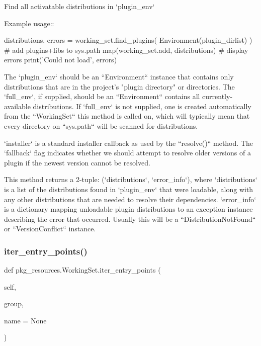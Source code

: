 \begin{DoxyVerb}Find all activatable distributions in `plugin_env`

Example usage::

    distributions, errors = working_set.find_plugins(
Environment(plugin_dirlist)
    )
    # add plugins+libs to sys.path
    map(working_set.add, distributions)
    # display errors
    print('Could not load', errors)

The `plugin_env` should be an ``Environment`` instance that contains
only distributions that are in the project's "plugin directory" or
directories. The `full_env`, if supplied, should be an ``Environment``
contains all currently-available distributions.  If `full_env` is not
supplied, one is created automatically from the ``WorkingSet`` this
method is called on, which will typically mean that every directory on
``sys.path`` will be scanned for distributions.

`installer` is a standard installer callback as used by the
``resolve()`` method. The `fallback` flag indicates whether we should
attempt to resolve older versions of a plugin if the newest version
cannot be resolved.

This method returns a 2-tuple: (`distributions`, `error_info`), where
`distributions` is a list of the distributions found in `plugin_env`
that were loadable, along with any other distributions that are needed
to resolve their dependencies.  `error_info` is a dictionary mapping
unloadable plugin distributions to an exception instance describing the
error that occurred. Usually this will be a ``DistributionNotFound`` or
``VersionConflict`` instance.
\end{DoxyVerb}
 \mbox{\label{classpkg__resources_1_1_working_set_a556736951f3aa317fa2d339d64e290ea}} 
\subsubsection{\texorpdfstring{iter\+\_\+entry\+\_\+points()}{iter\_entry\_points()}}
{\footnotesize\ttfamily def pkg\+\_\+resources.\+Working\+Set.\+iter\+\_\+entry\+\_\+points (\begin{DoxyParamCaption}\item[{}]{self,  }\item[{}]{group,  }\item[{}]{name = {\ttfamily None} }\end{DoxyParamCaption})}

